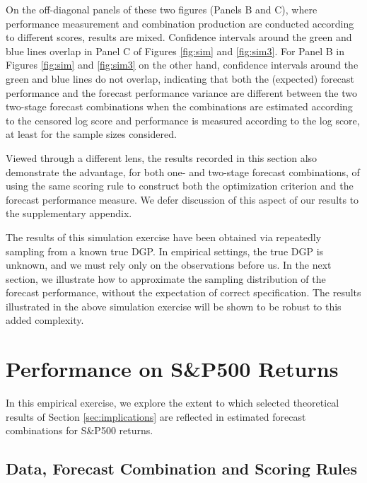 \documentclass[12pt]{article}
\theoremstyle{definition}
\theoremstyle{remark}
\begin{document}
On the off-diagonal panels of these two figures (Panels B and C), where performance measurement and combination production are conducted according to different scores, results are mixed. Confidence intervals around the green and blue lines overlap in Panel C of Figures \ref{fig:sim} and \ref{fig:sim3}. For Panel B in Figures \ref{fig:sim} and \ref{fig:sim3} on the other hand, confidence intervals around the green and blue lines do not overlap, indicating that both the (expected) forecast performance and the forecast performance variance are different between the two two-stage forecast combinations when the combinations are estimated according to the censored log score and performance is measured according to the log score, at least for the sample sizes considered.

Viewed through a different lens, the results recorded in this section also demonstrate the advantage, for both one- and two-stage forecast combinations, of using the same scoring rule to construct both the optimization criterion and the forecast performance measure. We defer discussion of this aspect of our results to the supplementary appendix.

The results of this simulation exercise have been obtained via repeatedly sampling from a known true DGP. In empirical settings, the true DGP is unknown, and we must rely only on the observations before us. In the next section, we illustrate how to approximate the sampling distribution of the forecast performance, without the expectation of correct specification. The results illustrated in the above simulation exercise will be shown to be robust to this added complexity.

\section{Performance on S\&P500 Returns\label{sec:emp}}

In this empirical exercise, we explore the extent to which selected theoretical results of Section \ref{sec:implications} are reflected in estimated forecast combinations for S\&P500 returns.

\subsection{Data, Forecast Combination and Scoring Rules\label{subsec:empdatacomb}}
\end{document}
